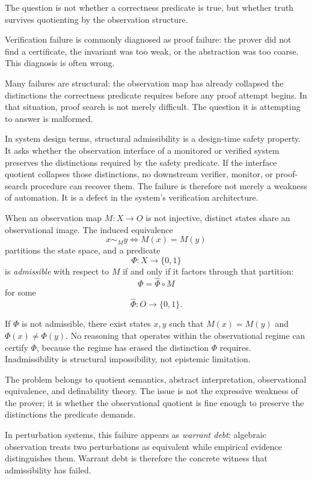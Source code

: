 \documentclass[pdflatex,sn-mathphys-num]{sn-jnl}
\theoremstyle{plain}
\theoremstyle{definition}
\theoremstyle{remark}
\begin{document}
The question is not whether a correctness predicate is true,
but whether truth survives quotienting by the observation structure.

Verification failure is commonly diagnosed as proof failure: the prover
did not find a certificate, the invariant was too weak, or the
abstraction was too coarse.
This diagnosis is often wrong.

Many failures are structural: the observation map has already collapsed
the distinctions the correctness predicate requires before any proof
attempt begins.
In that situation, proof search is not merely difficult.
The question it is attempting to answer is malformed.

In system design terms, structural admissibility is a design-time safety
property.
It asks whether the observation interface of a monitored or verified
system preserves the distinctions required by the safety predicate.
If the interface quotient collapses those distinctions, no downstream
verifier, monitor, or proof-search procedure can recover them.
The failure is therefore not merely a weakness of automation.
It is a defect in the system's verification architecture.

When an observation map $M : X \to O$ is not injective, distinct states
share an observational image.
The induced equivalence
\[
x \sim_M y \iff M(x) = M(y)
\]
partitions the state space, and a predicate
\[
\Phi : X \to \{0,1\}
\]
is \emph{admissible} with respect to $M$ if and only if it factors
through that partition:
\[
\Phi = \hat{\Phi} \circ M
\]
for some
\[
\hat{\Phi} : O \to \{0,1\}.
\]

If $\Phi$ is not admissible, there exist states $x, y$ such that
$M(x) = M(y)$ and $\Phi(x) \neq \Phi(y)$.
No reasoning that operates within the observational regime can certify
$\Phi$, because the regime has erased the distinction $\Phi$ requires.
Inadmissibility is structural impossibility, not epistemic limitation.

The problem belongs to quotient semantics, abstract interpretation,
observational equivalence, and definability theory.
The issue is not the expressive weakness of the prover; it is whether
the observational quotient is fine enough to preserve the distinctions
the predicate demands.

In perturbation systems, this failure appears as
\emph{warrant debt}: algebraic observation treats two perturbations as
equivalent while empirical evidence distinguishes them.
Warrant debt is therefore the concrete witness that admissibility has
failed.
\end{document}
